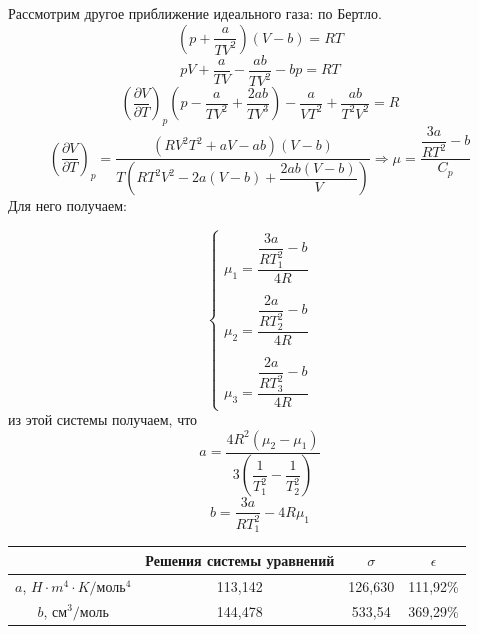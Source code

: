 \documentclass[a4paper, 12pt]{article}%
\begin{document}
Рассмотрим другое приближение идеального газа: по Бертло.
\[\left( p + \dfrac{a}{TV^2} \right) (V - b) = RT\]
\[pV + \dfrac{a}{TV} - \dfrac{ab}{TV^2} - bp = RT\]
\[\left(\dfrac{\partial V}{\partial T} \right)_p \left( p - \dfrac{a}{TV^2} + \dfrac{2ab}{TV^3} \right) - \dfrac{a}{VT^2} + \dfrac{ab}{T^2 V^2} = R\]
\[\left(\dfrac{\partial V}{\partial T} \right)_p = \dfrac{(RV^2T^2 + aV - ab)(V-b)}{T \left( RT^2V^2 - 2a(V-b) + \dfrac{2ab(V-b)}{V} \right)} \Rightarrow \mu = \dfrac{\dfrac{3a}{RT^2} - b}{C_p} \]
Для него получаем:

\begin{equation*} 
 		\begin{cases}
   			\mu_1 = \dfrac{\dfrac{3a}{RT_1^2} - b}{4R}\\
   			\\
   			\mu_2 = \dfrac{\dfrac{2a}{RT_2^2} - b}{4R}\\
   			\\
   			\mu_3 = \dfrac{\dfrac{2a}{RT_3^2} - b}{4R} 
   			\end{cases}
	\end{equation*}
	из этой системы получаем, что 
	\[a = \dfrac{4R^2(\mu_2 - \mu_1)}{3 \left( \dfrac{1}{T_1^2} - \dfrac{1}{T_2^2} \right)} \]
	\[b = \dfrac{3a}{RT_1^2} - 4R \mu_1 \]
	
\begin{tabular}{|c|c|c|c|}
\hline
                                          & Решения системы уравнений & $\sigma$   & $\epsilon$ \\ \hline
$a$, $H \cdot m^4 \cdot K/ \text{моль}^4$ & 113,142            & 126,630 & 111,92\%   \\ \hline
$b$, $\text{см}^3/\text{моль}$            & 144,478                & 533,54 & 369,29\%   \\ \hline
\end{tabular}
\end{document}
